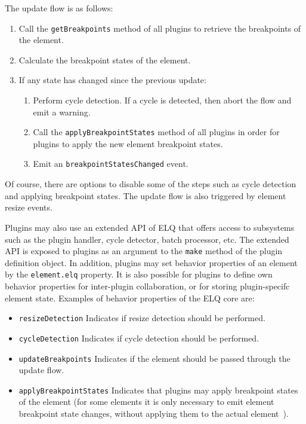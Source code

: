 \documentclass{llncs}
\newcommand{\code}[1]{\texttt{#1}}
\newcommand{\elq}{ELQ}
\begin{document}
  \noindent
  The update flow is as follows:
  \begin{enumerate}
    \item Call the \code{getBreakpoints} method of all plugins to retrieve the breakpoints of the element.
    \item Calculate the breakpoint states of the element.
    \item If any state has changed since the previous update:
    \begin{enumerate}
      \item Perform cycle detection. If a cycle is detected, then abort the flow and emit a warning.
      \item Call the \code{applyBreakpointStates} method of all plugins in order for plugins to apply the new element breakpoint states.
      \item Emit an \code{breakpointStatesChanged} event.
    \end{enumerate}
  \end{enumerate}

  \noindent
  Of course, there are options to disable some of the steps such as cycle detection and applying breakpoint states.
  The update flow is also triggered by element resize events.

  Plugins may also use an extended API of \elq{} that offers access to subsystems such as the plugin handler, cycle detector, batch processor, etc.
  The extended API is exposed to plugins as an argument to the \code{make} method of the plugin definition object.
  In addition, plugins may set behavior properties of an element by the \code{element.elq} property.
  It is also possible for plugins to define own behavior properties for inter-plugin collaboration, or for storing plugin-specifc element state.
  Examples of behavior properties of the \elq{} core are:
  \begin{itemize}
    \item \code{resizeDetection} Indicates if resize detection should be performed.
    \item \code{cycleDetection} Indicates if cycle detection should be performed.
    \item \code{updateBreakpoints} Indicates if the element should be passed through the update flow.
    \item \code{applyBreakpointStates} Indicates that plugins may apply breakpoint states of the element (for some elements it is only necessary to emit element breakpoint state changes, without applying them to the actual element~\cite{elq-thesis}).
  \end{itemize}
\end{document}
